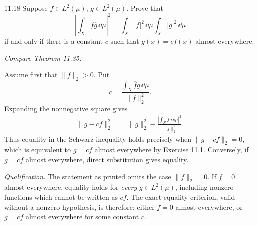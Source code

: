 \documentclass[11pt,oneside]{article}
\begin{document}
\begin{exercise}{11.18}
Suppose $f\in L^2(\mu)$, $g\in L^2(\mu)$. Prove that
\[
 \left|\int_X f\overline g\,\dd\mu\right|^2
 =\int_X|f|^2\,\dd\mu\int_X|g|^2\,\dd\mu
\]
if and only if there is a constant $c$ such that $g(x)=cf(x)$ almost everywhere.

\textit{Compare Theorem 11.35.}
\end{exercise}
\begin{solution}
Assume first that $\|f\|_2>0$. Put
\[
 c=\frac{\displaystyle\int_X\overline f g\,\dd\mu}{\|f\|_2^2}.
\]
Expanding the nonnegative square gives
\[
 \begin{aligned}
 \|g-cf\|_2^2
 &=\|g\|_2^2
   -\frac{\left|\int_X\overline f g\,\dd\mu\right|^2}{\|f\|_2^2}.
 \end{aligned}
\]
Thus equality in the Schwarz inequality holds precisely when $\|g-cf\|_2=0$, which is equivalent to $g=cf$ almost everywhere by Exercise 11.1. Conversely, if $g=cf$ almost everywhere, direct substitution gives equality.

\textit{Qualification.} The statement as printed omits the case $\|f\|_2=0$. If $f=0$ almost everywhere, equality holds for \emph{every} $g\in L^2(\mu)$, including nonzero functions which cannot be written as $cf$. The exact equality criterion, valid without a nonzero hypothesis, is therefore: either $f=0$ almost everywhere, or $g=cf$ almost everywhere for some constant $c$.
\end{solution}
\end{document}
